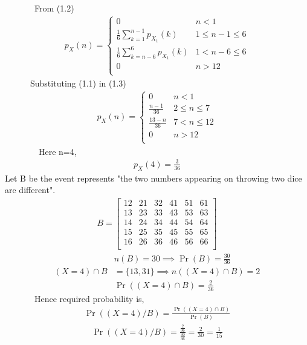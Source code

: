 \documentclass[journal,12pt,twocolumn]{IEEEtran}
\providecommand{\pr}[1]{\ensuremath{\Pr\left(#1\right)}}
\theoremstyle{remark}
\begin{document}
\ \ \ \ \ \ \ From (1.2)
\begin{align*}
  p_X(n) =
  \begin{cases}
  0 & n < 1 \\
  \frac{1}{6}\sum_{k=1}^{n-1}p_{X_1}(k) & 1 \leq n-1 \leq 6 \\
  \frac{1}{6}\sum_{k=n-6}^{6}p_{X_1}(k) & 1 < n-6 \leq 6 \\
  0 & n > 12 \\
  \end{cases}
  \tag{1.3}
  \end{align*}
  \ \ \ \ \ \ Substituting (1.1) in (1.3)
  \begin{align*}
  p_X(n) =
  \begin{cases}
  0 & n < 1 \\
  \frac{n-1}{36} & 2 \leq n \leq 7 \\
  \frac{13-n}{36} & 7 < n \leq 12 \\
  0 & n > 12 \\
  \end{cases}
  \end{align*}
  \ \ \ \ \ \ \ \ Here n=4,
  \begin{align*}
  p_X(4)=\frac{3}{36}
  \end{align*}
   Let B be the event represents "the two numbers appearing on throwing two dice are different".\\
\begin{align*}
B=
\begin{bmatrix}
12 & 21 & 32 & 41 & 51 & 61 \\
13 & 23 & 33 & 43 & 53 & 63 \\
14 & 24 & 34 & 44 & 54 & 64 \\
15 & 25 & 35 & 45 & 55 & 65 \\
16 & 26 & 36 & 46 & 56 & 66 \\
\end{bmatrix}
\end{align*}
\begin{align*}
& n(B)=30 \implies \pr{B}=\frac{30}{36} \\
{(X=4)} \cap B&=\{13,31\} \implies n({(X=4)} \cap B)=2 \\ 
& \pr{(X=4) \cap B}=\frac{2}{36} 
\end{align*}
\ \ \ \ \ \ \ Hence required probability is,
\begin{align*}
\pr{(X=4)/B}=\frac{\pr{(X=4) \cap B}}{\pr{B}} 
\end{align*}
\begin{align*}
\pr{(X=4)/B}=\frac{\frac{2}{36}}{\frac{30}{36}}=\frac{2}{30}=\frac{1}{15}
\end{align*}
\end{document}
